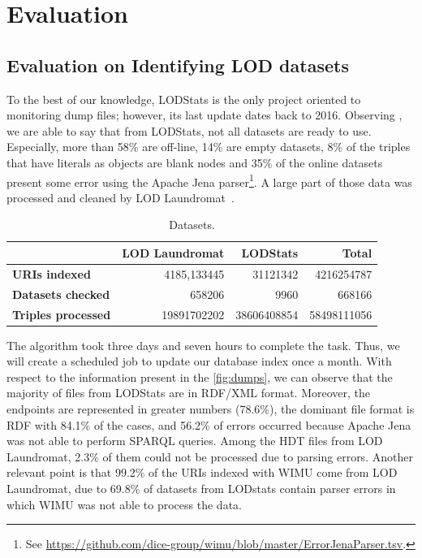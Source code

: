 \documentclass[sw]{iosart2x}
\begin{document}
\section{Evaluation}
\label{sec:eval}

\subsection{Evaluation on Identifying LOD datasets}

To the best of our knowledge, LODStats\cite{auer2012lodstats} is the only project oriented to monitoring dump files; however, its last update dates back to 2016. 
Observing , we are able to say that from LODStats, not all datasets are ready to use.
Especially, more than 58\% are off-line, 14\% are empty datasets, 8\% of the triples that have literals as objects are blank nodes and 35\% of the online datasets present some error using the Apache Jena parser\footnote{See \url{https://github.com/dice-group/wimu/blob/master/ErrorJenaParser.tsv}.}. 
A large part of those data was processed and cleaned by LOD Laundromat~\cite{beek2014lod}.


\setlength{\tabcolsep}{0.1em} %
\begin{table}[H]
	\centering
	\caption{Datasets.}
	\label{tab:lodstats}
    \begin{tabular}{|l|r|r|r|}
    \hline
    & \textbf{LOD Laundromat} & \textbf{LODStats} & \textbf{Total} \\ 
    \hline
    \textbf{URIs indexed} & \num{4185},\num{133445} & \num{31121342} & \num{4216254787} \\ \hline
    \textbf{Datasets checked} & \num{658206} & \num{9960} & \num{668166} \\ \hline
    \textbf{Triples processed} & \num{19891702202} & \num{38606408854} & \num{58498111056} \\
    \hline
    \end{tabular}
\end{table}

The algorithm took three days and seven hours to complete the task. 
Thus, we will create a scheduled job to update our database index once a month.
With respect to the information present in the \cref{fig:dumps}, we can observe that the majority of files from LODStats are in RDF/XML format.
Moreover, the endpoints are represented in greater numbers (78.6\%), the dominant file format is RDF with 84.1\% of the cases, and 56.2\% of errors occurred because Apache Jena was not able to perform SPARQL queries.
Among the HDT files from LOD Laundromat, 2.3\% of them could not be processed due to parsing errors.
Another relevant point is that 99.2\% of the URIs indexed with WIMU come from LOD Laundromat, due to 69.8\% of datasets from LODstats contain parser errors in which WIMU was not able to process the data.
\end{document}
